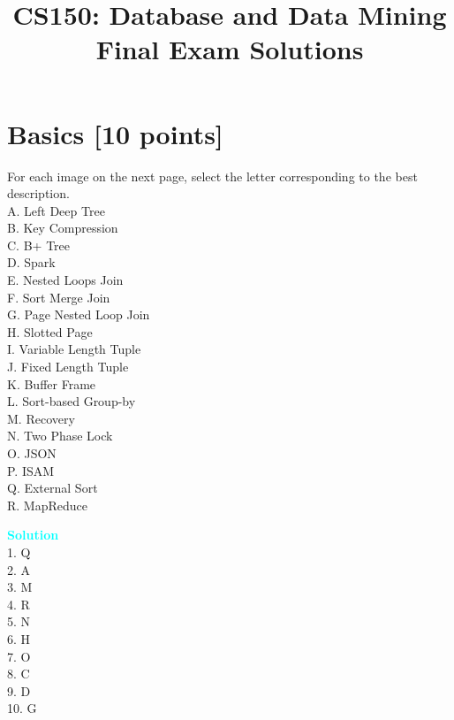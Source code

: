\documentclass[10pt]{article}
\newenvironment{solution}
    { \begin{mdframed}[backgroundcolor=gray!10] \textcolor{cyan}{\textbf{Solution}} \\}
    {  \end{mdframed}}
\begin{document}
\title{CS150: Database and Data Mining \\%
	Final Exam Solutions}
\maketitle


\section{Basics \textbf{[10 points]}}
For each image on the next page, select the letter corresponding to the best description. \\
A. Left Deep Tree \\
B. Key Compression \\
C. B+ Tree \\
D. Spark \\
E. Nested Loops Join \\
F. Sort Merge Join \\
G. Page Nested Loop Join \\
H. Slotted Page \\
I. Variable Length Tuple \\
J. Fixed Length Tuple \\
K. Buffer Frame \\
L. Sort-based Group-by \\
M. Recovery \\
N. Two Phase Lock \\
O. JSON \\
P. ISAM \\
Q. External Sort \\
R. MapReduce
\begin{solution}
	1. Q  \\
	2. A  \\
	3. M  \\
	4. R  \\
	5. N \\
	6. H  \\
	7. O  \\
	8. C \\
	9. D  \\
	10. G  \\
\end{solution}
\end{document}
